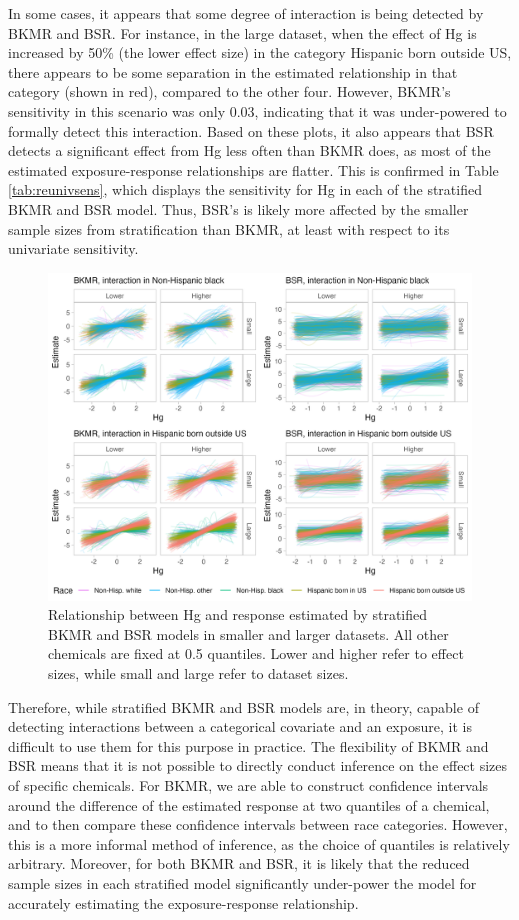 \documentclass[12pt, twoside]{amherstthesis}
\begin{document}
In some cases, it appears that some degree of interaction is being detected by BKMR and BSR. For instance, in the large dataset, when the effect of Hg is increased by 50\% (the lower effect size) in the category Hispanic born outside US, there appears to be some separation in the estimated relationship in that category (shown in red), compared to the other four. However, BKMR's sensitivity in this scenario was only 0.03, indicating that it was under-powered to formally detect this interaction. Based on these plots, it also appears that BSR detects a significant effect from Hg less often than BKMR does, as most of the estimated exposure-response relationships are flatter. This is confirmed in Table \ref{tab:reunivsens}, which displays the sensitivity for Hg in each of the stratified BKMR and BSR model. Thus, BSR's is likely more affected by the smaller sample sizes from stratification than BKMR, at least with respect to its univariate sensitivity.
\begin{figure}

{\centering \includegraphics[width=1\linewidth]{figures/ch4_re_expresp} 

}

\caption{Relationship between Hg and response estimated by stratified BKMR and BSR models in smaller and larger datasets. All other chemicals are fixed at 0.5 quantiles. Lower and higher refer to effect sizes, while small and large refer to dataset sizes.}\label{fig:exprespre}
\end{figure}
Therefore, while stratified BKMR and BSR models are, in theory, capable of detecting interactions between a categorical covariate and an exposure, it is difficult to use them for this purpose in practice. The flexibility of BKMR and BSR means that it is not possible to directly conduct inference on the effect sizes of specific chemicals. For BKMR, we are able to construct confidence intervals around the difference of the estimated response at two quantiles of a chemical, and to then compare these confidence intervals between race categories. However, this is a more informal method of inference, as the choice of quantiles is relatively arbitrary. Moreover, for both BKMR and BSR, it is likely that the reduced sample sizes in each stratified model significantly under-power the model for accurately estimating the exposure-response relationship.
\end{document}
